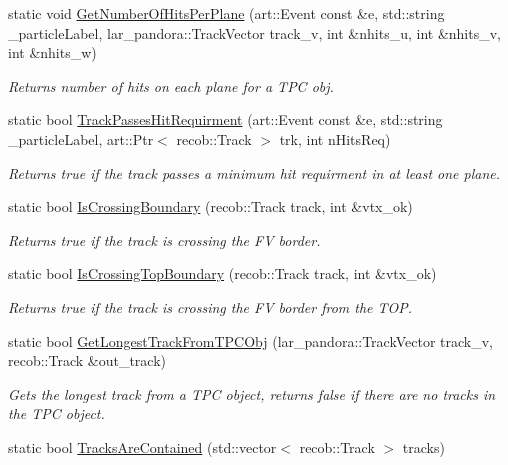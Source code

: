 \begin{DoxyCompactItemize}
static void \hyperlink{classUBXSecHelper_a5d811318d7fb66ab5e1816453c017e63}{Get\-Number\-Of\-Hits\-Per\-Plane} (art\-::\-Event const \&e, std\-::string \-\_\-particle\-Label, lar\-\_\-pandora\-::\-Track\-Vector track\-\_\-v, int \&nhits\-\_\-u, int \&nhits\-\_\-v, int \&nhits\-\_\-w)
\begin{DoxyCompactList}\small\item\em Returns number of hits on each plane for a T\-P\-C obj. \end{DoxyCompactList}\item 
static bool \hyperlink{classUBXSecHelper_accf62c400d9e984f1277843de78715a7}{Track\-Passes\-Hit\-Requirment} (art\-::\-Event const \&e, std\-::string \-\_\-particle\-Label, art\-::\-Ptr$<$ recob\-::\-Track $>$ trk, int n\-Hits\-Req)
\begin{DoxyCompactList}\small\item\em Returns true if the track passes a minimum hit requirment in at least one plane. \end{DoxyCompactList}\item 
static bool \hyperlink{classUBXSecHelper_aef82eb512853d8bd9a40fca00f254b7e}{Is\-Crossing\-Boundary} (recob\-::\-Track track, int \&vtx\-\_\-ok)
\begin{DoxyCompactList}\small\item\em Returns true if the track is crossing the F\-V border. \end{DoxyCompactList}\item 
static bool \hyperlink{classUBXSecHelper_af2924ae512f2c8cc5be6feb2bd21a112}{Is\-Crossing\-Top\-Boundary} (recob\-::\-Track track, int \&vtx\-\_\-ok)
\begin{DoxyCompactList}\small\item\em Returns true if the track is crossing the F\-V border from the T\-O\-P. \end{DoxyCompactList}\item 
static bool \hyperlink{classUBXSecHelper_a76b009afef0cc69f281ca3215a901f35}{Get\-Longest\-Track\-From\-T\-P\-C\-Obj} (lar\-\_\-pandora\-::\-Track\-Vector track\-\_\-v, recob\-::\-Track \&out\-\_\-track)
\begin{DoxyCompactList}\small\item\em Gets the longest track from a T\-P\-C object, returns false if there are no tracks in the T\-P\-C object. \end{DoxyCompactList}\item 
static bool \hyperlink{classUBXSecHelper_a44c8ae9d98197e81da26aeae26c70f0a}{Tracks\-Are\-Contained} (std\-::vector$<$ recob\-::\-Track $>$ tracks)

\end{DoxyCompactItemize}
